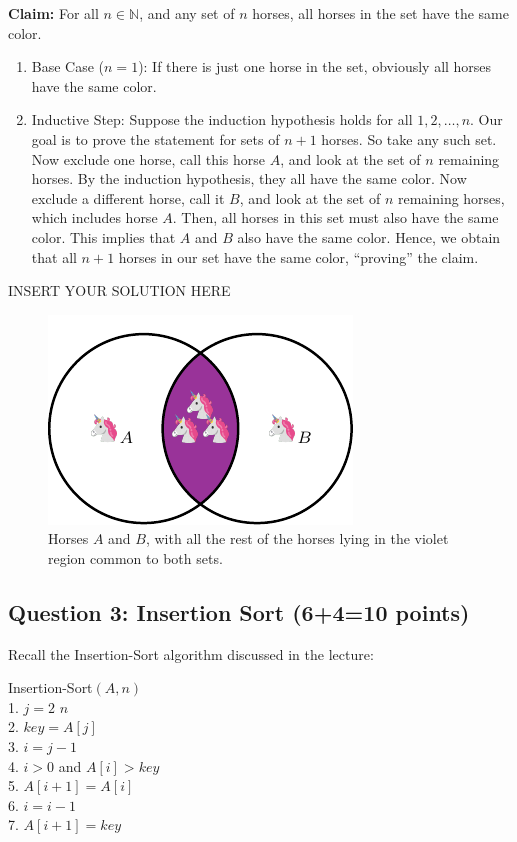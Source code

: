 \noindent \textbf{Claim:} For all $n \in \mathbb{N}$, and any set of $n$ horses, all horses in the set have the same color.

\begin{enumerate}
    \item Base Case ($n=1$): If there is just one horse in the set, obviously all horses have the same color.
    \item Inductive Step: Suppose the induction hypothesis holds for all $1,2,\ldots,n$. Our goal is to prove the statement for sets of $n+1$ horses. So take any such set. Now exclude one horse, call this horse $A$, and look at the set of $n$ remaining horses. By the induction hypothesis, they all have the same color. Now exclude a different horse, call it $B$, and look at the set of $n$ remaining horses, which includes horse $A$. Then, all horses in this set must also have the same color. This implies that $A$ and $B$ also have the same color. Hence, we obtain that all $n+1$ horses in our set have the same color, ``proving'' the claim. 
\end{enumerate}

\begin{solution}   INSERT YOUR SOLUTION HERE   \end{solution}


\begin{figure}[h]
    \centering
    \includegraphics{images/horse_venn.pdf}
    \caption{Horses $A$ and $B$, with all the rest of the horses lying in the violet region common to both sets.}
    \label{fig:horse}
\end{figure}




\subsection*{Question 3: Insertion Sort (6+4=10 points)}

Recall the {\sc Insertion-Sort} algorithm discussed in the lecture:
\begin{code}
	{\sc Insertion-Sort}$(A,n)$\\
	1. \> \For $j=2$ \To $n$\\
	2. \> \> $key=A[j]$\\
	3. \> \> $i=j-1$\\
	4. \> \> \While $i>0$ and $A[i]>key$\\
	5. \> \> \> $A[i+1]=A[i]$\\
	6. \> \> \> $i=i-1$\\
	7. \> \> $A[i+1]=key$
\end{code}

